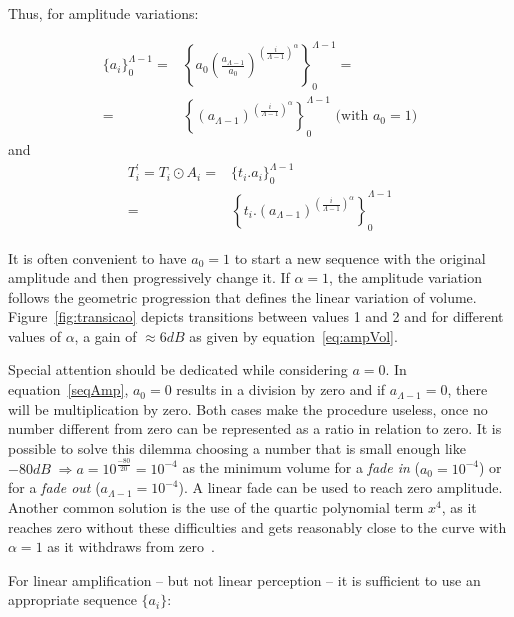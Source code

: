Thus, for amplitude variations:

\begin{equation}\label{seqAmp}
\begin{split}
 \{a_i\}_0^{\Lambda-1}= & \left \{ a_0 \left ( \frac{a_{\Lambda-1}}{a_0} \right )^{\left ( \frac{i}{\Lambda-1} \right )^\alpha} \right \}_0^{\Lambda-1}= \\ = & \left \{ \left ( {a_{\Lambda-1}} \right )^{\left ( \frac{i}{\Lambda-1} \right )^\alpha} \right \}_0^{\Lambda-1} \text{ (with } a_0=1 \text{)}
\end{split}
\end{equation}
and
\begin{equation}\label{transAmp}
\begin{split}
 T_i^{'}=T_i \odot A_i = & \{t_i . a_i\}_0^{\Lambda-1} \\ = & \left \{ t_i . (a_{\Lambda-1} )^{\left ( \frac{i}{\Lambda-1} \right )^\alpha} \right \}_0^{\Lambda-1}
\end{split}
\end{equation}

It is often convenient to have $a_0=1$ to start a new sequence with the original amplitude and then progressively change it.
If $\alpha=1$, the amplitude variation follows the geometric progression that defines the linear variation of volume. Figure~\ref{fig:transicao} depicts transitions between values 1 and 2 and for different values of $\alpha$, a gain of $\approx 6dB$ as given by equation~\ref{eq:ampVol}.

Special attention should be dedicated while considering $a=0$.
In equation~\ref{seqAmp}, $a_0=0$ results in a division by zero and if $a_{\Lambda-1}=0$, there will be multiplication by zero. Both cases make the procedure useless, once no number different from zero can be represented as a ratio in relation to zero. It is possible to solve this dilemma choosing a number that is small enough like $-80dB\;\Rightarrow a=10^{\frac{-80}{20}}=10^{-4}$ as the minimum volume for a \emph{fade in} ($a_0=10^{-4}$) or for a \emph{fade out} ($a_{\Lambda-1}=10^{-4}$). A linear fade can be used to reach zero amplitude. Another common solution is the use of the quartic polynomial term $x^4$, as it reaches zero without these difficulties and gets reasonably close to the curve with $\alpha=1$ as it withdraws from zero~\cite{Cook}.

For linear amplification -- but not linear perception -- it is sufficient to use an appropriate sequence $\{a_i\}$:

